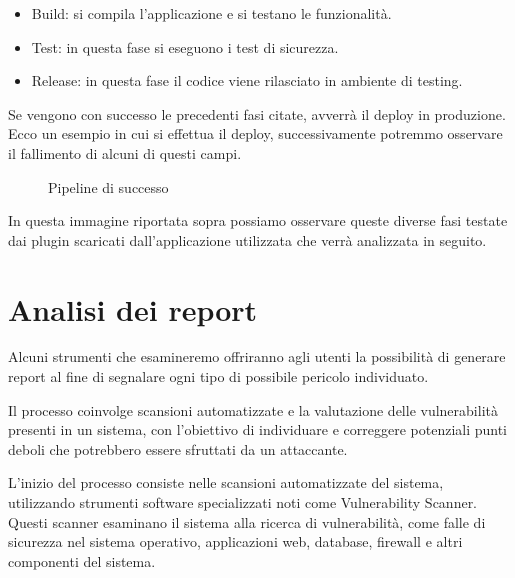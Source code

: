\begin{itemize}
    \item Build: si compila l’applicazione e si testano le funzionalità.
    \item Test: in questa fase si eseguono i test di sicurezza. 
    \item   Release: in questa fase il codice viene rilasciato in ambiente di testing.
\end{itemize}
Se vengono con successo le precedenti fasi citate,  avverrà il deploy in produzione.
Ecco un esempio in cui si effettua il deploy, successivamente potremmo osservare il fallimento di alcuni di questi campi.
\begin{figure}[H]
    \caption{Pipeline di successo}
    \label{fig:pipelineSuc}
\end{figure}
In questa immagine riportata sopra possiamo osservare queste diverse fasi testate dai plugin scaricati dall’applicazione utilizzata che verrà analizzata in seguito.
\section{Analisi dei report}
Alcuni strumenti che esamineremo offriranno agli utenti la possibilità di generare report al fine di segnalare ogni tipo di possibile pericolo individuato.

Il processo coinvolge scansioni automatizzate e la valutazione delle vulnerabilità presenti in un sistema, con l'obiettivo di individuare e correggere potenziali punti deboli che potrebbero essere sfruttati da un attaccante.

L'inizio del processo consiste nelle scansioni automatizzate del sistema, utilizzando strumenti software specializzati noti come Vulnerability Scanner. Questi scanner esaminano il sistema alla ricerca di vulnerabilità, come falle di sicurezza nel sistema operativo, applicazioni web, database, firewall e altri componenti del sistema.

